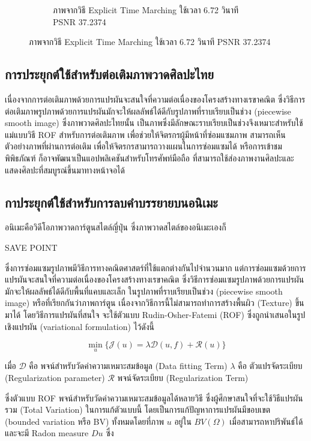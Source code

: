 \documentclass[hidelinks,a4paper,14pt]{article}
\numberwithin{equation}{section}							%
\begin{document}
{\begin{figure}[H]
\begin{subfigure}{0.4\linewidth}
					\caption{ภาพจากวิธี Explicit Time Marching ใช้เวลา 6.72 วินาที PSNR 37.2374}
				\end{subfigure}
			\end{figure}
			
			\subsection{การประยุกต์ใช้สำหรับต่อเติมภาพวาดศิลปะไทย}
			
			เนื่องจากการต่อเติมภาพด้วยการแปรผันจะสนใจที่ความต่อเนื่องของโครงสร้างทางเรขาคณิต ซึ่งวิธีการต่อเติมภาพรูปภาพด้วยการแปรผันมักจะให้ผลลัพธ์ได้ดีกับรูปภาพที่ราบเรียบเป็นช่วง (piecewise smooth image) \cite{ref:defination-of-variation-inpaint}  ซึ่งภาพวาดศิลปะไทยนั้น เป็นภาพซึ่งมีลักษณะราบเรียบเป็นช่วงจึงเหมาะสำหรับใช้แม่แบบวิธี ROF สำหรับการต่อเติมภาพ เพื่อช่วยให้จิตรกรผู้มีหน้าที่ซ่อมแซมภาพ สามารถเห็นตัวอย่างภาพที่ผ่านการต่อเติม เพื่อให้จิตรกรสามารถวางแผนในการซ่อมแซมได้ หรือการเข้าชมพิพิธภัณฑ์ ก็อาจพัฒนาเป็นแอปพลิเคชันสำหรับโทรศัพท์มือถือ ที่สามารถใช้ส่องภาพงานศิลปะและแสดงศิลปะที่สมบูรณ์ขึ้นมาทางหน้าจอได้
			
			
			\subsection{กาประยุกต์ใช้สำหรับการลบคำบรรยายบนอนิเมะ}
			อนิเมะคือวิดีโอภาพวาดการ์ตูนสไตล์ญี่ปุ่น ซึ่งภาพวาดสไตล์ของอนิเมะเองก็
			
	SAVE POINT
		
		
		ซึ่งการซ่อมแซมรูปภาพมีวิธีการทางคณิตศาสตร์ที่ใช้แตกต่างกันไปจำนวนมาก แต่การซ่อมแซมด้วยการแปรผันจะสนใจที่ความต่อเนื่องของโครงสร้างทางเรขาคณิต ซึ่งวิธีการซ่อมแซมรูปภาพด้วยการแปรผันมักจะให้ผลลัพธ์ได้ดีกับพื้นที่แคบและเล็ก ในรูปภาพที่ราบเรียบเป็นช่วง (piecewise smooth image) หรือที่เรียกกันว่าภาพการ์ตูน เนื่องจากวิธีการนี้ไม่สามารถทำการสร้างพื้นผิว (Texture) ขึ้นมาได้ \cite{ref:defination-of-variation-inpaint} โดยวิธีการแปรผันที่สนใจ จะใช้ตัวแบบ   Rudin-Osher-Fatemi (ROF) \cite{ref:ROF-template}ซึ่งถูกนำเสนอในรูปเชิงแปรผัน  (variational formulation) ไว้ดังนี้ 
		
		$$\min_{u} \{ \mathcal{J}(u)= \lambda \mathcal{D}(u,f)+  \mathcal{R}(u) \}$$

		เมื่อ $\mathcal{D}$ คือ พจน์สำหรับวัดค่าความเหมาะสมข้อมูล (Data fitting Term) $\lambda$ คือ ตัวแปรจัดระเบียบ (Regularization parameter)  $\mathcal{R}$ พจน์จัดระเบียบ (Regularization Term) 
		
		ซึ่งตัวแบบ ROF พจน์สำหรับวัดค่าความเหมาะสมข้อมูลได้หลายวิธี ซึ่งผู้ศึกษาสนใจที่จะใช้วิธีแปรผันรวม (Total Variation) \cite{ref:splitbergman-denoise} ในการแก้ตัวแบบนี้	 โดยเป็นการแก้ปัญหาการแปรผันมีขอบเขต (bounded variation หรือ BV) ทั้งหมดโดยที่ภาพ $u$ อยู่ใน $BV(\Omega)$ เมื่อสามารถหาปริพันธ์ได้และจะมี Radon measure $Du$ ซึ่ง 
		
}
\end{document}
